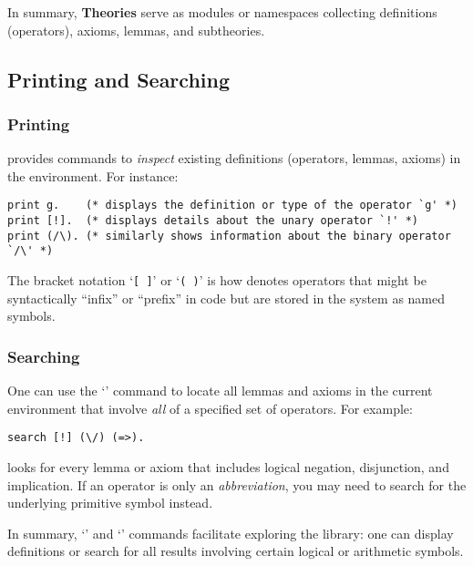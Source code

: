 In summary, \textbf{Theories} serve as modules or namespaces collecting definitions (operators), axioms, lemmas, and subtheories.

\subsection{Printing and Searching}
\subsubsection{Printing}
\EasyCrypt provides commands to \textit{inspect} existing definitions (operators, lemmas, axioms) in the environment. For instance:
\begin{lstlisting}[style=easycrypt]
print g.	(* displays the definition or type of the operator `g' *)
print [!].	(* displays details about the unary operator `!' *)
print (/\).	(* similarly shows information about the binary operator `/\' *)
\end{lstlisting}
The bracket notation `\texttt{[ ]}' or `\texttt{( )}' is how \EasyCrypt denotes operators that might be syntactically ``infix'' or ``prefix'' in code but are stored in the system as named symbols.
\subsubsection{Searching}
One can use the `' command to locate all lemmas and axioms in the current environment that involve \textit{all} of a specified set of operators. For example:
\begin{lstlisting}[style=easycrypt]
search [!] (\/) (=>).
\end{lstlisting}
looks for every lemma or axiom that includes logical negation, disjunction, and implication. If an operator is only an \textit{abbreviation}, you may need to search for the underlying primitive symbol instead.

In summary, `' and `' commands facilitate exploring the library: one can display definitions or search for all results involving certain logical or arithmetic symbols.







